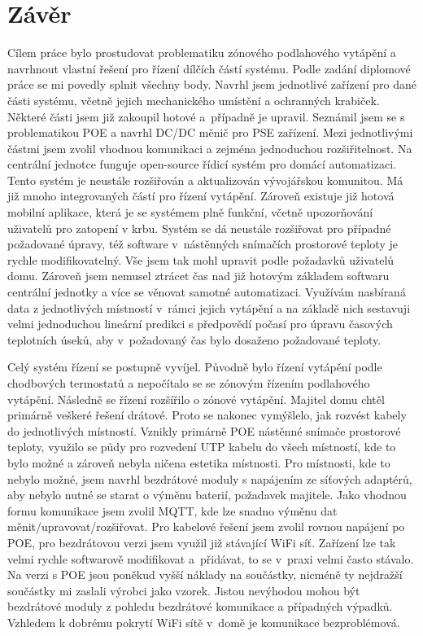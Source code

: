 \chapter{Závěr}
Cílem práce bylo prostudovat problematiku zónového podlahového vytápění a navrhnout vlastní řešení pro řízení dílčích částí systému. Podle zadání diplomové práce se mi povedly splnit všechny body. Navrhl jsem jednotlivé zařízení pro dané části systému, včetně jejich mechanického umístění a ochranných krabiček. Některé části jsem již zakoupil hotové a~případně je upravil. Seznámil jsem se s problematikou POE a navrhl DC/DC měnič pro PSE zařízení. Mezi jednotlivými částmi jsem zvolil vhodnou komunikaci a zejména jednoduchou rozšiřitelnost. Na centrální jednotce funguje open-source řídicí systém pro domácí automatizaci. Tento systém je neustále rozšiřován a aktualizován vývojářskou komunitou. Má již mnoho integrovaných částí pro řízení vytápění. Zároveň existuje již hotová mobilní aplikace, která je se systémem plně funkční, včetně upozorňování uživatelů pro zatopení v krbu. Systém se dá neustále rozšiřovat pro případné požadované úpravy, též software v~nástěnných snímačích prostorové teploty je rychle modifikovatelný. Vše jsem tak mohl upravit podle požadavků uživatelů domu. Zároveň jsem nemusel ztrácet čas nad již hotovým základem softwaru centrální jednotky a více se věnovat samotné automatizaci. Využívám nasbíraná data z jednotlivých místností v~rámci jejich vytápění a na základě nich sestavuji velmi jednoduchou lineární predikci s předpovědí počasí pro úpravu časových teplotních úseků, aby v~požadovaný čas bylo dosaženo požadované teploty. 

Celý systém řízení se postupně vyvíjel. Původně bylo řízení vytápění podle chodbových termostatů a nepočítalo se se zónovým řízením podlahového vytápění. Následně se řízení rozšířilo o zónové vytápění. Majitel domu chtěl primárně veškeré řešení drátové. Proto se nakonec vymýšlelo, jak rozvést kabely do jednotlivých místností. Vznikly primárně POE nástěnné snímače prostorové teploty, využilo se půdy pro rozvedení UTP kabelu do všech místností, kde to bylo možné a zároveň nebyla ničena estetika místnosti. Pro místnosti, kde to nebylo možné, jsem navrhl bezdrátové moduly s napájením ze síťových adaptérů, aby nebylo nutné se starat o výměnu baterií, požadavek majitele. Jako vhodnou formu komunikace jsem zvolil MQTT, kde lze snadno výměnu dat měnit/upravovat/rozšiřovat. Pro kabelové řešení jsem zvolil rovnou napájení po POE, pro bezdrátovou verzi jsem využil již stávající WiFi síť. Zařízení lze tak velmi rychle softwarově modifikovat a~přidávat, to se v~praxi velmi často stávalo. Na verzi s POE jsou poněkud vyšší náklady na součástky, nicméně ty nejdražší součástky mi zaslali výrobci jako vzorek. Jistou nevýhodou mohou být bezdrátové moduly z pohledu bezdrátové komunikace a případných výpadků. Vzhledem k dobrému pokrytí WiFi sítě v~domě je komunikace bezproblémová.

